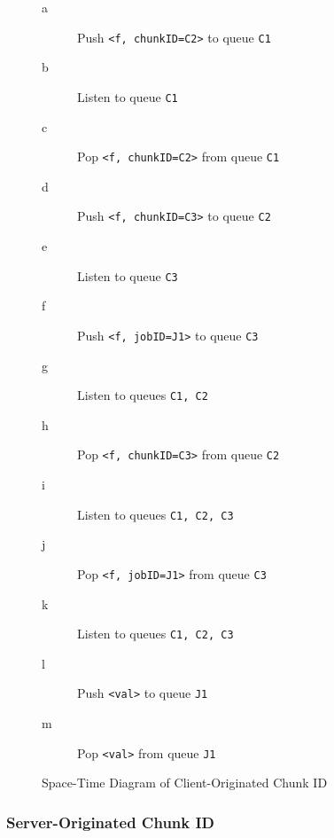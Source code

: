 \begin{figure}
\begin{minipage}{0.6\textwidth}
	\end{minipage}
	\begin{minipage}{0.4\textwidth}
		\begin{description}
			\item [\textcolor{dark2-1}{a}] Push \texttt{<f, chunkID=C2>} to queue \texttt{C1}
			\item [\textcolor{mygray}{b}] Listen to queue \texttt{C1}
			\item [\textcolor{dark2-1}{c}] Pop \texttt{<f, chunkID=C2>} from queue \texttt{C1}
			\item [\textcolor{dark2-3}{d}] Push \texttt{<f, chunkID=C3>} to queue \texttt{C2}
			\item [\textcolor{dark2-5}{e}] Listen to queue \texttt{C3}
			\item [\textcolor{dark2-5}{f}] Push \texttt{<f, jobID=J1>} to queue \texttt{C3}
			\item [\textcolor{mygray}{g}] Listen to queues \texttt{C1, C2}
			\item [\textcolor{dark2-3}{h}] Pop \texttt{<f, chunkID=C3>} from queue \texttt{C2}
			\item [\textcolor{mygray}{i}] Listen to queues \texttt{C1, C2, C3}
			\item [\textcolor{dark2-5}{j}] Pop \texttt{<f, jobID=J1>} from queue \texttt{C3}
			\item [\textcolor{mygray}{k}] Listen to queues \texttt{C1, C2, C3}
			\item [\textcolor{dark2-5}{l}] Push \texttt{<val>} to queue \texttt{J1}
			\item [\textcolor{dark2-5}{m}] Pop \texttt{<val>} from queue \texttt{J1}
		\end{description}
	\end{minipage}
	\caption{\label{fig:mci} Space-Time Diagram of Client-Originated Chunk ID}
\end{figure}

\subsubsection{Server-Originated Chunk ID}

